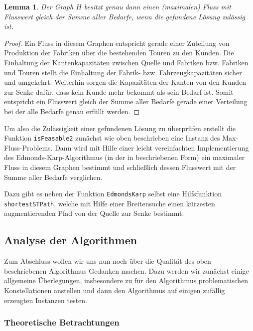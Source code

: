 \documentclass[a4paper,ngerman,11pt,bibtotoc]{scrartcl}
\theoremstyle{definition}
\theoremstyle{plain}
\newtheorem{lemma}[defn]{Lemma}
\theoremstyle{remark}
\begin{document}
	\begin{lemma}
		Der Graph $H$ besitzt genau dann einen (maximalen) Fluss mit Flusswert gleich der Summe aller Bedarfe, wenn die gefundene Lösung zulässig ist.
	\end{lemma}

	\begin{proof}
		Ein Fluss in diesem Graphen entspricht gerade einer Zuteilung von Produktion der Fabriken über die bestehenden Touren zu den Kunden. Die Einhaltung der Kantenkapazitäten zwischen Quelle und Fabriken bzw. Fabriken und Touren stellt die Einhaltung der Fabrik- bzw. Fahrzeugkapazitäten sicher und umgekehrt. Weiterhin sorgen die Kapazitäten der Kanten von den Kunden zur Senke dafür, dass kein Kunde mehr bekommt als sein Bedarf ist. Somit entspricht ein Flusswert gleich der Summe aller Bedarfe gerade einer Verteilung bei der alle Bedarfe genau erfüllt werden.
	\end{proof}

	Um also die Zulässigkeit einer gefundenen Lösung zu überprüfen erstellt die Funktion \lstinline|isFeasable2| zunächst wie oben beschrieben eine Instanz des Max-Fluss-Problems. Dann wird mit Hilfe einer leicht vereinfachten Implementierung des Edmonds-Karp-Algorithmus (in der in \cite{EdmondsKarp} beschriebenen Form) ein maximaler Fluss in diesem Graphen bestimmt und schließlich dessen Flusswert mit der Summe aller Bedarfe verglichen. 
	
	Dazu gibt es neben der Funktion \lstinline|EdmondsKarp| selbst eine Hilfsfunktion \lstinline|shortestSTPath|, welche mit Hilfe einer Breitensuche einen kürzesten augmentierenden Pfad von der Quelle zur Senke bestimmt.
	   	

	\subsection{Analyse der Algorithmen}\label{sec:Analyse}
	
	Zum Abschluss wollen wir uns nun noch über die Qualität des oben beschriebenen Algorithmus Gedanken machen. Dazu werden wir zunächst einige allgemeine Überlegungen, insbesondere zu für den Algorithmus problematischen Konstellationen anstellen und dann den Algorithmus auf einigen zufällig erzeugten Instanzen testen.
	
	\subsubsection{Theoretische Betrachtungen}\label{sec:Analyse:theoretisch}
	
\end{document}

